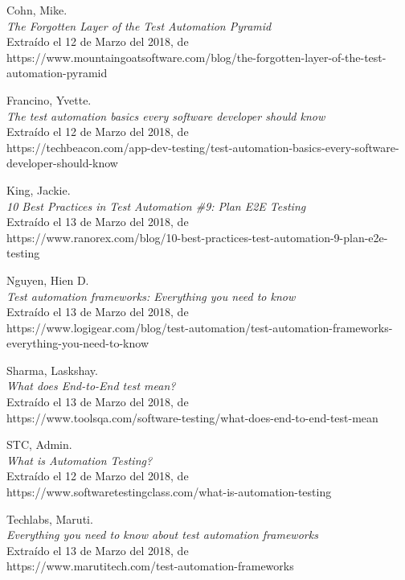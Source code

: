 \begin{thebibliography}{99}

 Cohn, Mike.\\
\emph{The Forgotten Layer of the Test Automation Pyramid}\\
Extraído el 12 de Marzo del 2018, de\\
https://www.mountaingoatsoftware.com/blog/the-forgotten-layer-of-the-test-automation-pyramid

 Francino, Yvette.\\
\emph{The test automation basics every software developer should know}\\
Extraído el 12 de Marzo del 2018, de\\
https://techbeacon.com/app-dev-testing/test-automation-basics-every-software-developer-should-know

 King, Jackie.\\
\emph{10 Best Practices in Test Automation \#9: Plan E2E Testing}\\
Extraído el 13 de Marzo del 2018, de\\
https://www.ranorex.com/blog/10-best-practices-test-automation-9-plan-e2e-testing

 Nguyen, Hien D.\\
\emph{Test automation frameworks: Everything you need to know}\\
Extraído el 13 de Marzo del 2018, de\\
https://www.logigear.com/blog/test-automation/test-automation-frameworks-everything-you-need-to-know

 Sharma, Laskshay.\\
\emph{What does End-to-End test mean?}\\
Extraído el 13 de Marzo del 2018, de\\
https://www.toolsqa.com/software-testing/what-does-end-to-end-test-mean

 STC, Admin.\\
\emph{What is Automation Testing?}\\
Extraído el 12 de Marzo del 2018, de\\
https://www.softwaretestingclass.com/what-is-automation-testing

 Techlabs, Maruti.\\
\emph{Everything you need to know about test automation frameworks}\\
Extraído el 13 de Marzo del 2018, de\\
https://www.marutitech.com/test-automation-frameworks

\end{thebibliography}

